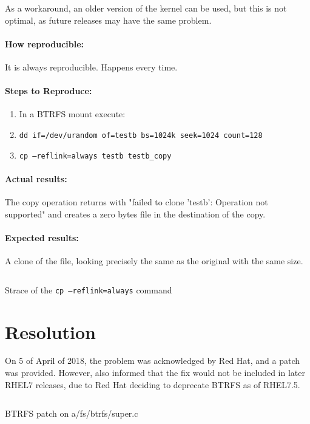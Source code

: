 As a workaround, an older version of the kernel can be used, but this is not optimal, as future releases may have the same problem.

\paragraph{How reproducible:}

It is always reproducible. Happens every time.

\paragraph{Steps to Reproduce:}

\begin{enumerate}
	\item In a BTRFS mount execute:
	\item \texttt{dd if=/dev/urandom of=testb bs=1024k seek=1024 count=128}
	\item \texttt{cp --reflink=always testb testb\_copy}
\end{enumerate}

\paragraph{Actual results:}
The copy operation returns with "failed to clone 'testb': Operation not supported" and creates a zero bytes file in the destination of the copy.

\paragraph{Expected results:}

A clone of the file, looking precisely the same as the original with the same size.

\begin{listing}[ht]
\inputminted{bash}{./Chapters/Code/annex3_strace.sh}
\caption{Strace of the \texttt{cp --reflink=always} command}
\label{listing:bug_strace}
\end{listing}


\section{Resolution}
\label{sec:resolution}
On 5 of April of 2018, the problem was acknowledged by Red Hat, and a patch was provided. However, also informed that the fix would not be included in later RHEL7 releases, due to Red Hat deciding to deprecate BTRFS as of RHEL7.5.

\begin{listing}[ht]
\inputminted{diff}{./Chapters/Code/annex3_btrfspatch.diff}
\caption{BTRFS patch on a/fs/btrfs/super.c}
\label{listing:bug_btrfsdiff}
\end{listing}
